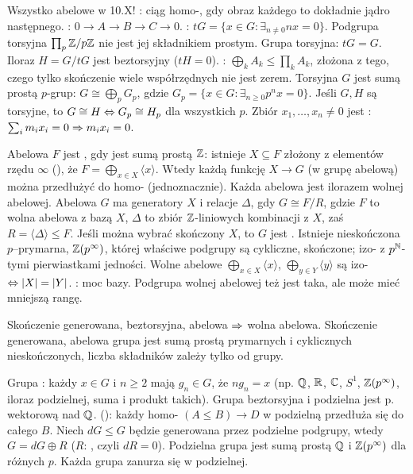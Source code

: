 Wszystko  abelowe w 10.X!
: ciąg homo-, gdy obraz każdego to dokładnie jądro następnego.
: $0 \to A \to B \to C \to 0$.
: $tG = \{x \in G : \exists_{n \neq 0} nx = 0\}$.
Podgrupa torsyjna $\prod_p \mathbb{Z}/p\mathbb{Z}$ nie jest jej składnikiem prostym.
Grupa torsyjna: $tG = G$.
Iloraz $H = G/tG$ jest beztorsyjny ($tH = 0$).
: $\bigoplus_k A_k \le \prod_k A_k$, złożona z tego, czego tylko skończenie wiele współrzędnych nie jest zerem.
Torsyjna $G$ jest sumą prostą $p$-grup: $G \cong \bigoplus_p G_p$, gdzie $G_p = \{x \in G : \exists_{n \ge 0} p^n x = 0\}$.
Jeśli $G, H$ są torsyjne, to $G \cong H \Leftrightarrow G_p \cong H_p$ dla wszystkich $p$.
Zbiór $x_1, \ldots, x_n \neq 0$ jest : $\sum_i m_i x_i = 0 \Rightarrow m_i x_i = 0$.

Abelowa $F$  jest , gdy jest sumą prostą $\mathbb{Z}$: istnieje $X \subseteq F$ złożony z elementów rzędu $\infty$ (), że $F = \bigoplus_{x \in X} \langle x \rangle$.
Wtedy każdą funkcję $X \to G$ (w grupę abelową) można przedłużyć do homo- (jednoznacznie).
Każda abelowa jest ilorazem wolnej abelowej.
Abelowa $G$ ma generatory $X$ i relacje $\Delta$, gdy $G \cong F/R$, gdzie $F$ to wolna abelowa z bazą $X$, $\Delta$ to zbiór $\mathbb{Z}$-liniowych kombinacji z $X$, zaś $R = \langle \Delta \rangle \le F$.
Jeśli można wybrać skończony $X$, to $G$ jest .
Istnieje nieskończona $p$--prymarna, $\mathbb{Z}(p^\infty)$, której właściwe podgrupy są cykliczne, skończone; izo- z $p^{\mathbb{N}}$-tymi pierwiastkami jedności.
Wolne abelowe $\bigoplus_{x \in X} \langle x \rangle$, $\bigoplus_{y \in Y} \langle y \rangle$ są izo- $\Leftrightarrow |X| = |Y|$.
: moc bazy.
Podgrupa wolnej abelowej też jest taka, ale może mieć mniejszą rangę.

Skończenie  generowana, beztorsyjna, abelowa $\Rightarrow$ wolna abelowa.
Skończenie generowana, abelowa grupa jest sumą prostą prymarnych i cyklicznych nieskończonych, liczba składników zależy tylko od grupy.

Grupa  : każdy $x \in G$ i $n \ge 2$ mają $g_n \in G$, że $n g_n = x$ (np. $\mathbb{Q}$, $\mathbb{R}$, $\mathbb{C}$, $S^1$, $\mathbb{Z}(p^\infty)$, iloraz podzielnej, suma i produkt takich).
Grupa beztorsyjna i podzielna jest p. wektorową nad $\mathbb{Q}$.
 (): każdy homo- $(A \le B) \to D$ w podzielną przedłuża się do całego $B$.
Niech $dG \le G$ będzie generowana przez podzielne podgrupy, wtedy $G = dG \oplus R$ ($R$: , czyli $dR = 0$).
Podzielna grupa jest sumą prostą $\mathbb{Q}$ i $\mathbb{Z}(p^\infty)$ dla różnych $p$.
Każda grupa zanurza się w podzielnej.

